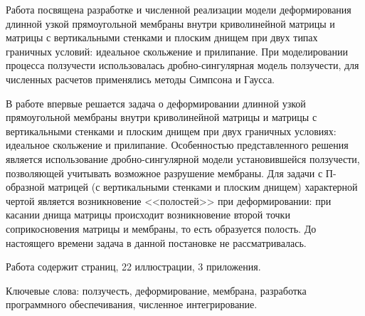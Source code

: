 Работа посвящена разработке и численной реализации модели деформирования длинной узкой 
прямоугольной мембраны внутри криволинейной матрицы и матрицы с вертикальными стенками и плоским днищем
при двух типах граничных условий: идеальное скольжение и прилипание.
При моделировании процесса ползучести использовалась дробно-сингулярная
модель ползучести, для численных расчетов применялись методы Симпсона и Гаусса.

В работе впервые решается задача о деформировании длинной узкой прямоугольной мембраны внутри криволинейной матрицы и матрицы с вертикальными стенками и плоским днищем при двух граничных условиях: идеальное скольжение и прилипание. Особенностью представленного решения является использование дробно-сингулярной модели установившейся ползучести, позволяющей учитывать возможное разрушение мембраны. Для задачи с П-образной матрицей 
(с вертикальными стенками и плоским днищем) характерной чертой является возникновение <<полостей>> при деформировании: при касании днища матрицы
происходит возникновение второй точки соприкосновения матрицы и мембраны, то есть образуется полость. До настоящего времени задача в данной постановке не рассматривалась.

Работа содержит \pageref{LastPage} страниц, 22 иллюстрации, 3 приложения.



Ключевые слова: ползучесть, деформирование, мембрана, разработка программного обеспечивания, численное интегрирование.
\newpage